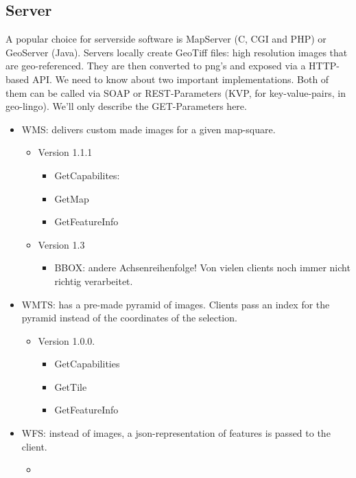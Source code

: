 \subsection{Server}
A popular choice for serverside software is MapServer (C, CGI and PHP) or GeoServer (Java). Servers locally create GeoTiff files: high resolution images that are geo-referenced. They are then converted to png's and exposed via a HTTP-based API. We need to know about two important implementations. Both of them can be called via SOAP or REST-Parameters (KVP, for key-value-pairs, in geo-lingo). We'll only describe the GET-Parameters here. 

\begin{itemize}
    \item WMS: delivers custom made images for a given map-square. 
    \begin{itemize}
        \item Version 1.1.1
            \begin{itemize}
                \item GetCapabilites: 
                \item GetMap 
                \item GetFeatureInfo
            \end{itemize}
        \item Version 1.3
            \begin{itemize}
                \item BBOX: andere Achsenreihenfolge! Von vielen clients noch immer nicht richtig verarbeitet. 
            \end{itemize}
    \end{itemize}
    
    \item WMTS: has a pre-made pyramid of images. Clients pass an index for the pyramid instead of the coordinates of the selection. 
    \begin{itemize}
        \item Version 1.0.0.
            \begin{itemize}
                \item GetCapabilities 
                \item GetTile 
                \item GetFeatureInfo
            \end{itemize}
    \end{itemize}

    \item WFS: instead of images, a json-representation of features is passed to the client. 
        \begin{itemize}
            \item 
        \end{itemize}
\end{itemize}

